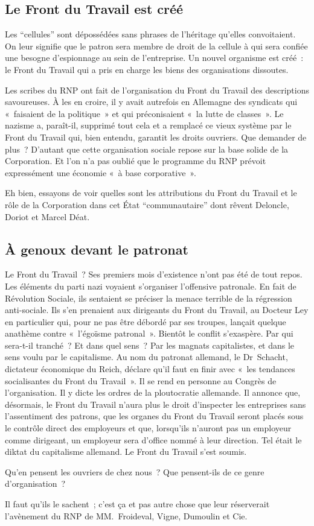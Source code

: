 \documentclass[french,twoside]{book} %
\begin{document}
\subsection[Le Front du Travail est créé]{Le Front du Travail est créé}
\noindent Les “cellules” sont dépossédées sans phrases de l’héritage qu’elles convoitaient. On leur signifie que le patron sera membre de droit de la cellule à qui sera confiée une besogne d’espionnage au sein de l’entreprise. Un nouvel organisme est créé : le Front du Travail qui a pris en charge les biens des organisations dissoutes.\par
Les scribes du RNP ont fait de l’organisation du Front du Travail des descriptions savoureuses. À les en croire, il y avait autrefois en Allemagne des syndicats qui « faisaient de la politique » et qui préconisaient « la lutte de classes ». Le nazisme a, paraît-il, supprimé tout cela et a remplacé ce vieux système par le Front du Travail qui, bien entendu, garantit les droits ouvriers. Que demander de plus ? D’autant que cette organisation sociale repose sur la base solide de la Corporation. Et l’on n’a pas oublié que le programme du RNP prévoit expressément une économie « à base corporative ».\par
Eh bien, essayons de voir quelles sont les attributions du Front du Travail et le rôle de la Corporation dans cet État “communautaire” dont rêvent Deloncle, Doriot et Marcel Déat.
\subsection[À genoux devant le patronat]{À genoux devant le patronat}
\noindent Le Front du Travail ? Ses premiers mois d’existence n’ont pas été de tout repos. Les éléments du parti nazi voyaient s’organiser l’offensive patronale. En fait de Révolution Sociale, ils sentaient se préciser la menace terrible de la régression anti-sociale. Ils s’en prenaient aux dirigeants du Front du Travail, au Docteur Ley en particulier qui, pour ne pas être débordé par ses troupes, lançait quelque anathème contre « l’égoïsme patronal ». Bientôt le conflit s’exaspère. Par qui sera-t-il tranché ? Et dans quel sens ? Par les magnats capitalistes, et dans le sens voulu par le capitalisme. Au nom du patronat allemand, le Dr Schacht, dictateur économique du Reich, déclare qu’il faut en finir avec « les tendances socialisantes du Front du Travail ». Il se rend en personne au Congrès de l’organisation. Il y dicte les ordres de la ploutocratie allemande. Il annonce que, désormais, le Front du Travail n’aura plus le droit d’inspecter les entreprises sans l’assentiment des patrons, que les organes du Front du Travail seront placés sous le contrôle direct des employeurs et que, lorsqu’ils n’auront pas un employeur comme dirigeant, un employeur sera d’office nommé à leur direction. Tel était le diktat du capitalisme allemand. Le Front du Travail s’est soumis.\par
Qu’en pensent les ouvriers de chez nous ? Que pensent-ils de ce genre d’organisation ?\par
Il faut qu’ils le sachent ; c’est ça et pas autre chose que leur réserverait l’avènement du RNP de MM. Froideval, Vigne, Dumoulin et Cie.
\end{document}
